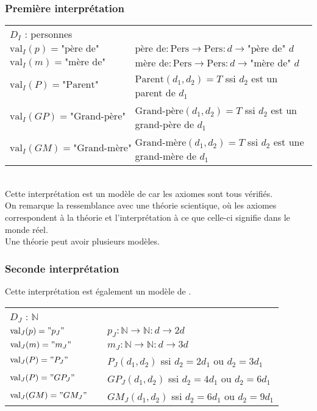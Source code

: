 \subsubsection{Première interprétation}
\begin{tabular}{lll}
$D_I$ : personnes&&\\
$\text{val}_I(p)=\text{"père de"}$ &\hspace*{1cm} &$\text{père de} : \text{Pers}\rightarrow\text{Pers} : d \rightarrow \text{"père de" }d$\\
$\text{val}_I(m)=\text{"mère de"}$ &\hspace*{1cm} &$\text{mère de} : \text{Pers}\rightarrow\text{Pers} : d \rightarrow \text{"mère de" }d$\\
$\text{val}_I(P)=\text{"Parent"}$ &\hspace*{1cm} &$\text{Parent}(d_1,d_2)=T$ ssi $d_2$ est un parent de $d_1$\\
$\text{val}_I(GP)=\text{"Grand-père"}$ &\hspace*{1cm} &$\text{Grand-père}(d_1,d_2)=T$ ssi $d_2$ est un grand-père de $d_1$\\
$\text{val}_I(GM)=\text{"Grand-mère"}$ &\hspace*{1cm} &$\text{Grand-mère}(d_1,d_2)=T$ ssi $d_2$ est une grand-mère de $d_1$\\
\end{tabular}\\

Cette interprétation est un modèle de  car les axiomes sont tous vérifiés.\\
On remarque la ressemblance avec une théorie scientique, où les axiomes correspondent à la théorie et l'interprétation à ce que celle-ci signifie dans le monde réel.\\
Une théorie peut avoir plusieurs modèles.\\ 
\subsubsection{Seconde interprétation}
Cette interprétation est également un modèle de .\\

\begin{tabular}{lll}
$D_J$ : $\mathbb{N}$&&\\
$\text{val}_J(p)="p_J"$ &\hspace*{1cm} &$p_J : \mathbb{N}\rightarrow\mathbb{N} : d \rightarrow 2d$\\
$\text{val}_J(m)="m_J"$ &\hspace*{1cm} &$m_J : \mathbb{N}\rightarrow\mathbb{N} : d \rightarrow 3d$\\
$\text{val}_J(P)="P_J"$ &\hspace*{1cm} &$P_J(d_1,d_2)$ ssi $d_2=2d_1$ ou $d_2=3d_1$\\
$\text{val}_J(P)="GP_J"$ &\hspace*{1cm} &$GP_J(d_1,d_2)$ ssi $d_2=4d_1$ ou $d_2=6d_1$\\
$\text{val}_J(GM)="GM_J"$ &\hspace*{1cm} &$GM_J(d_1,d_2)$ ssi $d_2=6d_1$ ou $d_2=9d_1$\\
\end{tabular}\\

